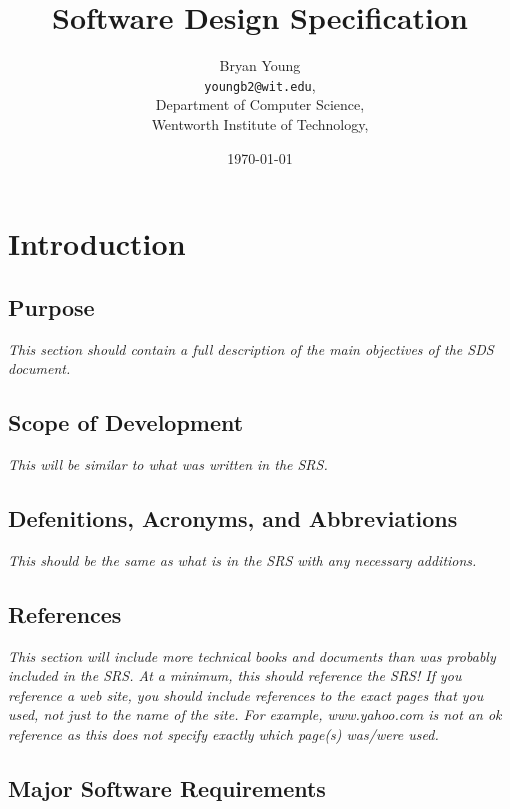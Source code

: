 \documentclass[11pt,a4paper]{article}
\begin{document}
\author{Bryan Young\\
	\texttt{youngb2@wit.edu},\\
	Department of Computer Science,\\
	Wentworth Institute of Technology,}
\title{Software Design Specification}
\date{\today{}}
\maketitle
\newpage

\tableofcontents
\newpage

\section{Introduction}
\subsection{Purpose}
\textit{This section should contain a full description of the main objectives of the SDS document.}

\subsection{Scope of Development}
\textit{This will be similar to what was written in the SRS.}

\subsection{Defenitions, Acronyms, and Abbreviations}
\textit{This should be the same as what is in the SRS with any necessary additions. }

\subsection{References}
\textit{This section will include more technical books and documents than was probably included in the SRS. At a minimum, this should reference the SRS! \newline\newline
If you reference a web site, you should include references to the exact pages that you used, not just to the name of the site. For example, www.yahoo.com is not an ok reference as this does not specify exactly which page(s) was/were used.}

\subsection{Major Software Requirements}
\end{document}
